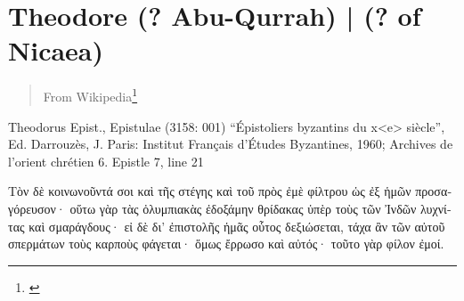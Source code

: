 \documentclass[12pt,letterpaper,twoside,final]{memoir}
\begin{document}
\section{Theodore (? Abu-Qurrah) | (? of Nicaea)}
\blockquote[From Wikipedia\footnote{\url{}}]{}
\begin{greek}
Theodorus Epist., Epistulae (3158: 001)
“Épistoliers byzantins du x<e> siècle”, Ed. Darrouzès, J.
Paris: Institut Français d'Études Byzantines, 1960; Archives de l'orient chrétien 6.
Epistle 7, line 21

Τὸν δὲ κοινωνοῦντά σοι καὶ τῆς στέγης καὶ τοῦ πρὸς ἐμὲ φίλτρου 
ὡς ἐξ ἡμῶν προσαγόρευσον· οὕτω γὰρ τὰς ὀλυμπιακὰς ἐδοξάμην θρίδακας 
ὑπὲρ τοὺς τῶν Ἰνδῶν λυχνίτας καὶ σμαράγδους· εἰ δὲ δι' ἐπιστολῆς ἡμᾶς 
οὗτος δεξιώσεται, τάχα ἂν τῶν αὐτοῦ σπερμάτων τοὺς καρποὺς φάγεται· 
ὅμως ἔρρωσο καὶ αὐτός· τοῦτο γὰρ φίλον ἐμοί. 
\end{greek}



\backmatter
\end{document}
